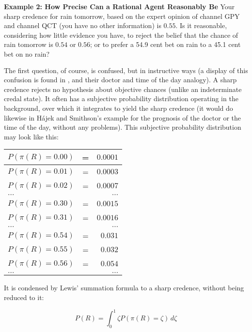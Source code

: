 \begin{quotex}
  \textbf{Example 2: How Precise Can a Rational Agent
    Reasonably Be} Your sharp credence for rain
  tomorrow, based on the expert opinion of channel GPY
  and channel QCT (you have no other information) is
  $0.55$. Is it reasonable, considering how little
  evidence you have, to reject the belief that the
  chance of rain tomorrow is $0.54$ or $0.56$; or to
  prefer a 54.9 cent bet on rain to a 45.1 cent bet on
  no rain?
\end{quotex}

The first question, of course, is confused, but in
instructive ways (a display of this confusion is found
in , and their doctor
and time of the day analogy). A sharp credence rejects
no hypothesis about objective chances (unlike an
indeterminate credal state). It often has a subjective
probability distribution operating in the background,
over which it integrates to yield the sharp credence
(it would do likewise in H{\'a}jek and Smithson's
example for the prognosis of the doctor or the time of
the day, without any problems). This subjective
probability distribution may look like this:

\begin{tabular}{|lcr|} 
  \hline
  $P(\pi(R)=0.00)$ & = & $0.0001$ \\ \hline
  $P(\pi(R)=0.01)$ & = & $0.0003$ \\ \hline
  $P(\pi(R)=0.02)$ & = & $0.0007$ \\ \hline
  $\ldots$ & & $\ldots$ \\ \hline
  $P(\pi(R)=0.30)$ & = & $0.0015$ \\ \hline
  $P(\pi(R)=0.31)$ & = & $0.0016$ \\ \hline
  $\ldots$ & & $\ldots$ \\ \hline
  $P(\pi(R)=0.54)$ & = & $0.031$ \\ \hline
  $P(\pi(R)=0.55)$ & = & $0.032$ \\ \hline
  $P(\pi(R)=0.56)$ & = & $0.054$ \\ \hline
  $\ldots$ & & $\ldots$ \\ \hline
\end{tabular}

It is condensed by Lewis' summation formula to a sharp
credence, without being reduced to it:

\begin{equation}
  \label{eq:s2}
  P(R)=\int_{0}^{1}\zeta{}P(\pi(R)=\zeta)\,d\zeta
\end{equation}

